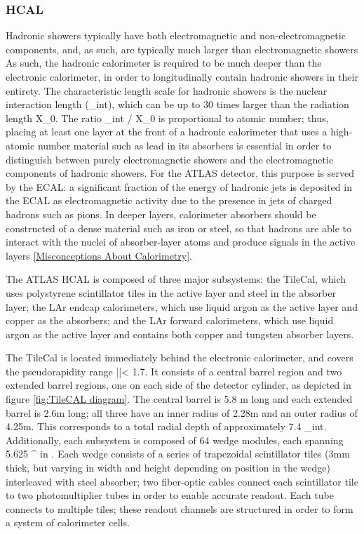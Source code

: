 \subsubsection{HCAL} \label{sec:HCAL} 

Hadronic showers typically have both electromagnetic and non-electromagnetic components, and, as such, are typically much larger than electromagnetic showers  As such, the hadronic calorimeter is required to be much deeper than the electronic calorimeter, in order to longitudinally contain hadronic showers in their entirety. The characteristic length scale for hadronic showers is the nuclear interaction length (\lambda\_{int}), which can be up to 30 times larger than the radiation length X_0. The ratio \lambda\_{int} / X_0 is proportional to atomic number; thus, placing at least one layer at the front of a hadronic calorimeter that uses a high-atomic number material such as lead in its absorbers is essential in order to distinguish between purely electromagnetic showers and the electromagnetic components of hadronic showers. For the ATLAS detector, this purpose is served by the ECAL: a significant fraction of the energy of hadronic jets is deposited in the ECAL as electromagnetic activity due to the presence in jets of charged hadrons such as pions. In deeper layers, calorimeter absorbers should be constructed of a dense material such as iron or steel, so that hadrons are able to interact with the nuclei of absorber-layer atoms and produce signals in the active layers \ref{Misconceptions About Calorimetry}.  

The ATLAS HCAL is composed of three major subsystems: the TileCal, which uses polystyrene scintillator tiles in the active layer and steel in the absorber layer; the LAr endcap calorimeters, which use liquid argon as the active layer and copper as the absorbers; and the LAr forward calorimeters, which use liquid argon as the active layer and contains both copper and tungsten absorber layers.

The TileCal is located immediately behind the electronic calorimeter, and covers the pseudorapidity range |\eta |< 1.7. It consists of a central barrel region and two extended barrel regions, one on each side of the detector cylinder, as depicted in figure \ref{fig:TileCAL diagram}. The central barrel is 5.8 m long and each extended barrel is 2.6m long; all three have an inner radius of 2.28m and an outer radius of 4.25m. This corresponds to a total radial depth of approximately 7.4 \lambda\_{int}. Additionally, each subsystem is composed of 64 wedge modules, each spanning 5.625 {^\deg} in \phi . Each wedge consists of a series of trapezoidal scintillator tiles (3mm thick, but varying in width and height depending on position in the wedge) interleaved with steel absorber; two fiber-optic cables connect each scintillator tile to two photomultiplier tubes in order to enable accurate readout. Each tube connects to multiple tiles; these readout channels are structured in order to form a system of calorimeter cells. 

